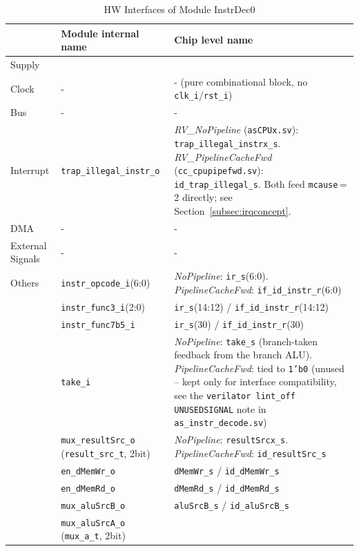 \begin{table}[H]
\caption{HW Interfaces of Module InstrDec0}
\label{tab:asDecPer02}
\centering
\begin{tabularx}{\textwidth}{|l |l |X|}
  \hline
   & Module internal name & Chip level name \\
  \hline
  \hline
  Supply &  &  \\
  \hline
  Clock & - & - (pure combinational block, no \texttt{clk\_i}/\texttt{rst\_i}) \\
  \hline
  Bus & - & - \\
  \hline
  Interrupt & \texttt{trap\_illegal\_instr\_o} &
    \textit{RV\_NoPipeline} (\texttt{asCPUx.sv}): \texttt{trap\_illegal\_instrx\_s}.
    \textit{RV\_PipelineCacheFwd} (\texttt{cc\_cpupipefwd.sv}):
    \texttt{id\_trap\_illegal\_s}. Both feed \texttt{mcause}\,=\,2 directly;
    see Section~\ref{subsec:irqconcept}. \\
  \hline
  DMA & - & - \\
  \hline
  External Signals & - & - \\
  \hline
  Others & \texttt{instr\_opcode\_i}(6:0) &
    \textit{NoPipeline}: \texttt{ir\_s}(6:0). \textit{PipelineCacheFwd}:
    \texttt{if\_id\_instr\_r}(6:0) \\
         & \texttt{instr\_func3\_i}(2:0) &
    \texttt{ir\_s}(14:12) / \texttt{if\_id\_instr\_r}(14:12) \\
         & \texttt{instr\_func7b5\_i} &
    \texttt{ir\_s}(30) / \texttt{if\_id\_instr\_r}(30) \\
         & \texttt{take\_i} &
    \textit{NoPipeline}: \texttt{take\_s} (branch-taken feedback from the
    branch ALU). \textit{PipelineCacheFwd}: tied to \texttt{1'b0}
    (unused -- kept only for interface compatibility, see the
    \texttt{verilator lint\_off UNUSEDSIGNAL} note in
    \texttt{as\_instr\_decode.sv}) \\
         & \texttt{mux\_resultSrc\_o} (\texttt{result\_src\_t}, 2\;bit) &
    \textit{NoPipeline}: \texttt{resultSrcx\_s}. \textit{PipelineCacheFwd}:
    \texttt{id\_resultSrc\_s} \\
         & \texttt{en\_dMemWr\_o} & \texttt{dMemWr\_s} / \texttt{id\_dMemWr\_s} \\
         & \texttt{en\_dMemRd\_o} & \texttt{dMemRd\_s} / \texttt{id\_dMemRd\_s} \\
         & \texttt{mux\_aluSrcB\_o} & \texttt{aluSrcB\_s} / \texttt{id\_aluSrcB\_s} \\
         & \texttt{mux\_aluSrcA\_o} (\texttt{mux\_a\_t}, 2\;bit) &

\end{tabularx}
\end{table}
